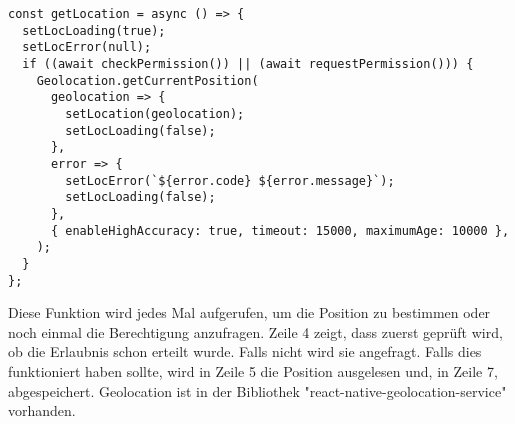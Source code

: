 \begin{lstlisting}
const getLocation = async () => {
  setLocLoading(true);
  setLocError(null);
  if ((await checkPermission()) || (await requestPermission())) {
    Geolocation.getCurrentPosition(
      geolocation => {
        setLocation(geolocation);
        setLocLoading(false);
      },
      error => {
        setLocError(`${error.code} ${error.message}`);
        setLocLoading(false);
      },
      { enableHighAccuracy: true, timeout: 15000, maximumAge: 10000 },
    );
  }
};
\end{lstlisting}

Diese Funktion wird jedes Mal aufgerufen, um die Position zu bestimmen oder noch einmal die
Berechtigung anzufragen. Zeile 4 zeigt, dass zuerst geprüft wird, ob die Erlaubnis schon erteilt
wurde. Falls nicht wird sie angefragt. Falls dies funktioniert haben sollte, wird in Zeile 5 die
Position ausgelesen und, in Zeile 7, abgespeichert. Geolocation ist in der Bibliothek
"react-native-geolocation-service" vorhanden.